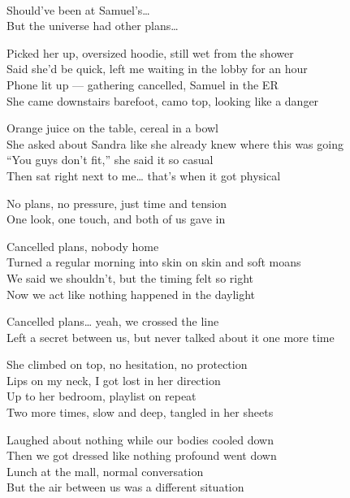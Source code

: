 \begin{lyrics}

\\
Should’ve been at Samuel’s…\\
But the universe had other plans…

Picked her up, oversized hoodie, still wet from the shower\\
Said she’d be quick, left me waiting in the lobby for an hour\\
Phone lit up — gathering cancelled, Samuel in the ER\\
She came downstairs barefoot, camo top, looking like a danger

Orange juice on the table, cereal in a bowl\\
She asked about Sandra like she already knew where this was going\\
“You guys don’t fit,” she said it so casual\\
Then sat right next to me… that’s when it got physical

No plans, no pressure, just time and tension\\
One look, one touch, and both of us gave in

Cancelled plans, nobody home\\
Turned a regular morning into skin on skin and soft moans\\
We said we shouldn’t, but the timing felt so right\\
Now we act like nothing happened in the daylight

Cancelled plans… yeah, we crossed the line\\
Left a secret between us, but never talked about it one more time

She climbed on top, no hesitation, no protection\\
Lips on my neck, I got lost in her direction\\
Up to her bedroom, playlist on repeat\\
Two more times, slow and deep, tangled in her sheets

Laughed about nothing while our bodies cooled down\\
Then we got dressed like nothing profound went down\\
Lunch at the mall, normal conversation\\
But the air between us was a different situation


\end{lyrics}
